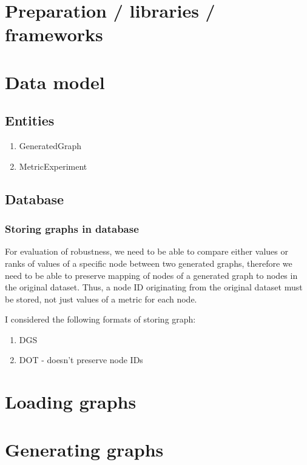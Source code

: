 \section{Preparation / libraries / frameworks}


\section{Data model}

\subsection{Entities}
\begin{enumerate}
    \item GeneratedGraph
    \item MetricExperiment
\end{enumerate}

\subsection{Database}

\subsubsection{Storing graphs in database}

For evaluation of robustness, we need to be able to compare either values or ranks of values of a specific node between two generated graphs, therefore we need to be able to preserve mapping of nodes of a generated graph to nodes in the original dataset.
Thus, a node ID originating from the original dataset must be stored, not just values of a metric for each node.

I considered the following formats of storing graph:
\begin{enumerate}
    \item DGS
    \item DOT - doesn't preserve node IDs
\end{enumerate}


\section{Loading graphs}


\section{Generating graphs}

